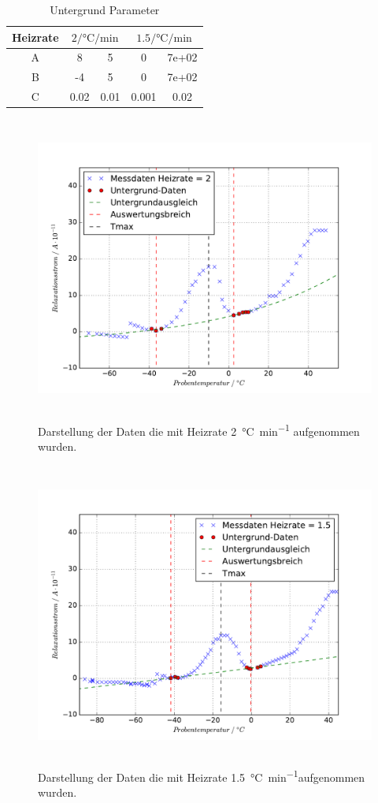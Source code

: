 \begin{table}
 \centering
 \caption{Untergrund Parameter}
 \begin{tabular}{c| S@{${}\pm{}$} S | S@{${}\pm{}$} S}
   \toprule
    Heizrate &
     &
     \\
   \midrule
	A & 8&5&0&7e+02\\
	B&-4&5&0&7e+02\\
	C &0.02&0.01&0.001&0.02\\
   \bottomrule
 \end{tabular}
 \label{tab:Uparam}
\end{table}

\begin{figure}
  \centering
  \includegraphics[height = 10cm]{plots/M1UGplot.pdf}
  \caption{Darstellung der Daten die mit Heizrate \SI{2}{\celsius\per\minute} aufgenommen wurden.}
  \label{fig:U2plot}
\end{figure}
\begin{figure}
  \centering
  \includegraphics[height = 10cm]{plots/M2UGplot.pdf}
  \caption{Darstellung der Daten die mit Heizrate \SI{1.5}{\celsius\per\minute}aufgenommen wurden.}
  \label{fig:U15plot}
\end{figure}
\FloatBarrier
